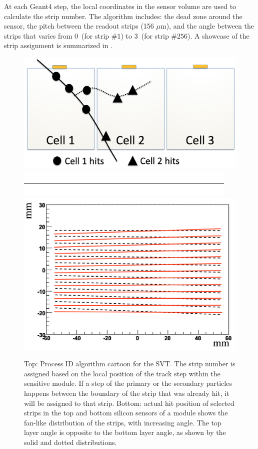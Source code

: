 At each Geant4 step, the local coordinates in the sensor volume are used to calculate the strip number.
The algorithm includes: the dead zone around the sensor, the pitch between the readout strips (156 $\mu$m), and the angle
between the strips that varies from 0\mdeg \ (for strip $\# 1$) to 3\mdeg \ (for strip  $\# 256$). A showcase of the strip assignment
is summarized in .

\begin{figure}
	\centering
	\includegraphics[width=0.99\columnwidth,keepaspectratio]{img/bstHit.png}
	\includegraphics[width=0.99\columnwidth,keepaspectratio]{img/blank.png}
	\includegraphics[width=0.99\columnwidth,keepaspectratio]{img/bstStrip.png}
	\caption{Top: Process ID algorithm cartoon for the SVT. The strip number is assigned based on the local position of the track
            step within the sensitive module. If a step of the primary or the secondary particles happens between the boundary
            of the strip that was already hit, it will be assigned to that strip. Bottom: actual hit position of selected
            strips in the top and bottom silicon sensors of a module shows the fan-like distribution of the strips,
            with increasing angle. The top layer angle is opposite to the bottom layer angle, as shown by the solid and dotted distributions. }
	\label{fig:processID}
\end{figure}

